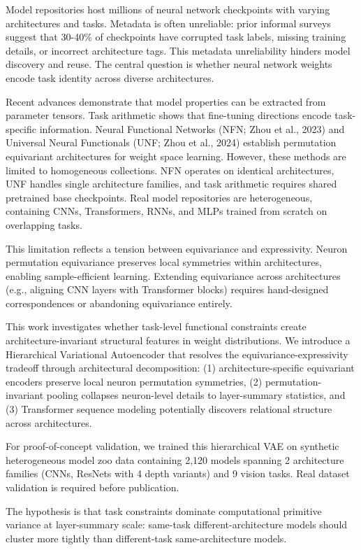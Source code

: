 
Model repositories host millions of neural network checkpoints with varying architectures and tasks. Metadata is often unreliable: prior informal surveys suggest that 30-40\% of checkpoints have corrupted task labels, missing training details, or incorrect architecture tags. This metadata unreliability hinders model discovery and reuse. The central question is whether neural network weights encode task identity across diverse architectures.

Recent advances demonstrate that model properties can be extracted from parameter tensors. Task arithmetic \citep{Ilharco2022} shows that fine-tuning directions encode task-specific information. Neural Functional Networks (NFN; Zhou et al., 2023) and Universal Neural Functionals (UNF; Zhou et al., 2024) establish permutation equivariant architectures for weight space learning. However, these methods are limited to homogeneous collections. NFN operates on identical architectures, UNF handles single architecture families, and task arithmetic requires shared pretrained base checkpoints. Real model repositories are heterogeneous, containing CNNs, Transformers, RNNs, and MLPs trained from scratch on overlapping tasks.

This limitation reflects a tension between equivariance and expressivity. Neuron permutation equivariance preserves local symmetries within architectures, enabling sample-efficient learning. Extending equivariance across architectures (e.g., aligning CNN layers with Transformer blocks) requires hand-designed correspondences or abandoning equivariance entirely.

This work investigates whether task-level functional constraints create architecture-invariant structural features in weight distributions. We introduce a Hierarchical Variational Autoencoder that resolves the equivariance-expressivity tradeoff through architectural decomposition: (1) architecture-specific equivariant encoders preserve local neuron permutation symmetries, (2) permutation-invariant pooling collapses neuron-level details to layer-summary statistics, and (3) Transformer sequence modeling potentially discovers relational structure across architectures.

For proof-of-concept validation, we trained this hierarchical VAE on synthetic heterogeneous model zoo data containing 2,120 models spanning 2 architecture families (CNNs, ResNets with 4 depth variants) and 9 vision tasks. Real dataset validation is required before publication.

The hypothesis is that task constraints dominate computational primitive variance at layer-summary scale: same-task different-architecture models should cluster more tightly than different-task same-architecture models.

